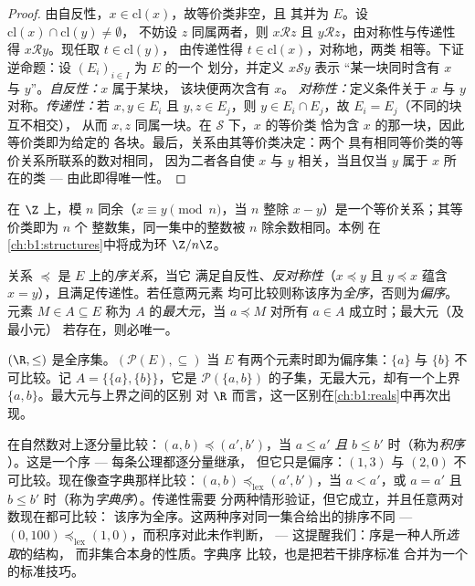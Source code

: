 \begin{proof}
由自反性，$x \in \mathrm{cl}(x)$，故等价类非空，且
其并为 $E$。设 $\mathrm{cl}(x) \cap \mathrm{cl}(y) \neq \emptyset$，
不妨设 $z$ 同属两者，则 $x \mathbin{\mathcal{R}} z$ 且 $y
\mathbin{\mathcal{R}} z$，由对称性与传递性得 $x
\mathbin{\mathcal{R}} y$。现任取 $t \in \mathrm{cl}(y)$，
由传递性得 $t \in \mathrm{cl}(x)$，对称地，两类
相等。下证逆命题：设 $(E_i)_{i \in I}$ 为 $E$ 的一个
划分，并定义 $x \mathbin{\mathcal S} y$ 表示
“某一块同时含有 $x$ 与 $y$”。\emph{自反性：}$x$ 属于某块，
该块便两次含有 $x$。
\emph{对称性：}定义条件关于 $x$ 与
$y$ 对称。\emph{传递性：}若 $x, y \in E_i$ 且 $y, z \in E_j$，则
$y \in E_i \cap E_j$，故 $E_i = E_j$（不同的块互不相交），
从而 $x, z$ 同属一块。在 $\mathcal S$ 下，$x$ 的等价类
恰为含 $x$ 的那一块，因此等价类即为给定的
各块。最后，关系由其等价类决定：两个
具有相同等价类的等价关系所联系的数对相同，
因为二者各自使 $x$ 与 $y$ 相关，当且仅当 $y$ 属于
$x$ 所在的类 --- 由此即得唯一性。
\end{proof}

\begin{example}\label{ex:b1:logic:congruence}
在 $\Z$ 上，模 $n$ 同余（$x \equiv y \pmod n$，当 $n$ 整除
$x - y$）是一个等价关系；其等价类即为 $n$ 个
整数集，同一集中的整数被 $n$ 除余数相同。本例
在\cref{ch:b1:structures}中将成为环 $\Z/n\Z$。
\end{example}

\begin{definition}[序关系]\label{def:b1:logic:order}
关系 $\preceq$ 是 $E$ 上的\emph{序关系}，当它
满足自反性、\emph{反对称性}（$x \preceq y$ 且 $y
\preceq x$ 蕴含 $x = y$），且满足传递性。若任意两元素
均可比较则称该序为\emph{全序}，否则为\emph{偏序}。元素
$M \in A \subseteq E$ 称为 $A$ 的\emph{最大元}，当
$a \preceq M$ 对所有 $a \in A$ 成立时；最大元（及最小元）
若存在，则必唯一。
\end{definition}

\begin{example}\label{ex:b1:logic:orders}
$(\R, \leq)$ 是全序集。$(\mathcal{P}(E), \subseteq)$ 当
$E$ 有两个元素时即为偏序集：$\{a\}$ 与
$\{b\}$ 不可比较。记 $A = \{\{a\}, \{b\}\}$，它是
$\mathcal{P}(\{a,b\})$ 的子集，无最大元，却有一个上界
$\{a, b\}$。最大元与上界之间的区别
对 $\R$ 而言，这一区别在\cref{ch:b1:reals}中再次出现。
\end{example}

\begin{example}[网格 $\N^2$ 上的两种序]\label{ex:b1:logic:lexorder}
在自然数对上逐分量比较：$(a, b) \preceq (a',
b')$，当 $a \leq a'$ \emph{且} $b \leq b'$ 时（称为\emph{积序}
）。这是一个序 --- 每条公理都逐分量继承，
但它只是偏序：$(1, 3)$ 与 $(2, 0)$
不可比较。现在像查字典那样比较：$(a, b)
\preceq_{\mathrm{lex}} (a', b')$，当 $a < a'$，或 $a = a'$ 且 $b
\leq b'$ 时（称为\emph{字典序}）。传递性需要
分两种情形验证，但它成立，并且任意两对数现在都可比较：
该序为全序。这两种序对同一集合给出的排序不同
--- $(0, 100) \preceq_{\mathrm{lex}} (1, 0)$，而积序对此未作判断，
--- 这提醒我们：序是一种人所\emph{选取}的结构，
而非集合本身的性质。字典序
比较，也是把若干排序标准
合并为一个的标准技巧。
\end{example}

